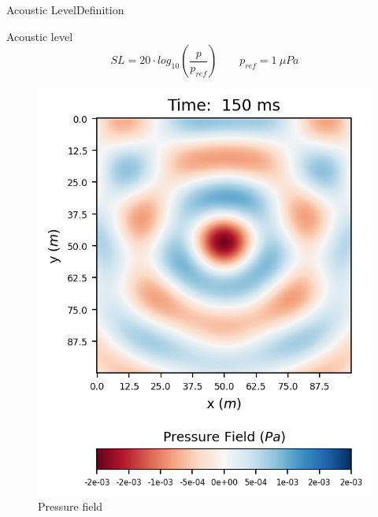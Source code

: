 \documentclass[9pt, xcolor={usenames, dvipsnames}]{beamer}
\begin{document}
				\begin{frame}{Acoustic Level}{Definition}
					\centering
					\begin{minipage}{0.8\textwidth}
						\begin{alertblock}{Acoustic level}
							\begin{equation}
								SL = 20 \cdot log_{10}\left(\frac{p}{p_{ref}}\right) \qquad p_{ref} = 1\ \mu Pa
							\end{equation}
						\end{alertblock}
					\end{minipage}
					\begin{minipage}[c]{0.35\textwidth}
						\begin{figure}
							\includegraphics[width=\textwidth]{images/sphere/2dfdtd_00149.png}
							\caption{Pressure field}
						\end{figure}
					\end{minipage}
					\hspace{1cm}
					\begin{minipage}[c]{0.35\textwidth}
						\begin{figure}

\end{figure}
\end{minipage}
\end{frame}
\end{document}
